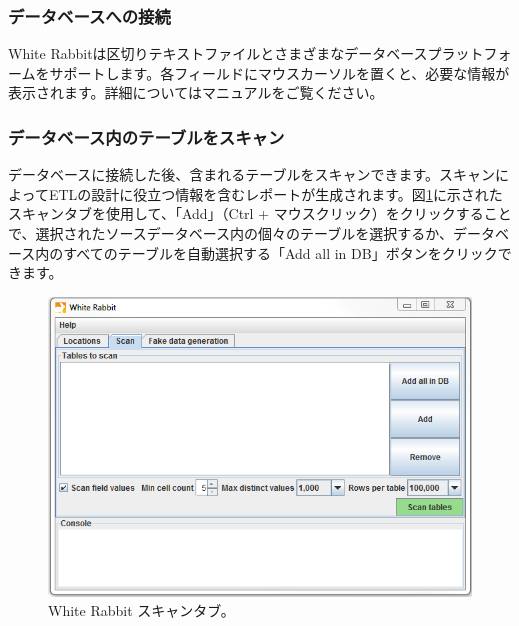 \documentclass[
  11pt]{book}
\theoremstyle{definition}
\theoremstyle{definition}
\theoremstyle{definition}
\theoremstyle{definition}
\theoremstyle{remark}
\begin{document}
\subsubsection*{データベースへの接続}\label{ux30c7ux30fcux30bfux30d9ux30fcux30b9ux3078ux306eux63a5ux7d9a}

White Rabbitは区切りテキストファイルとさまざまなデータベースプラットフォームをサポートします。各フィールドにマウスカーソルを置くと、必要な情報が表示されます。詳細についてはマニュアルをご覧ください。

\subsubsection*{データベース内のテーブルをスキャン}\label{ux30c7ux30fcux30bfux30d9ux30fcux30b9ux5185ux306eux30c6ux30fcux30d6ux30ebux3092ux30b9ux30adux30e3ux30f3}

データベースに接続した後、含まれるテーブルをスキャンできます。スキャンによってETLの設計に役立つ情報を含むレポートが生成されます。図\ref{fig:WhiteRabbitAddTables}に示されたスキャンタブを使用して、「Add」（Ctrl + マウスクリック）をクリックすることで、選択されたソースデータベース内の個々のテーブルを選択するか、データベース内のすべてのテーブルを自動選択する「Add all in DB」ボタンをクリックできます。

\begin{figure}

{\centering \includegraphics[width=1\linewidth]{images/ExtractTransformLoad/WhiteRabbitAddTables} 

}

\caption{White Rabbit スキャンタブ。}\label{fig:WhiteRabbitAddTables}
\end{figure}
\end{document}
